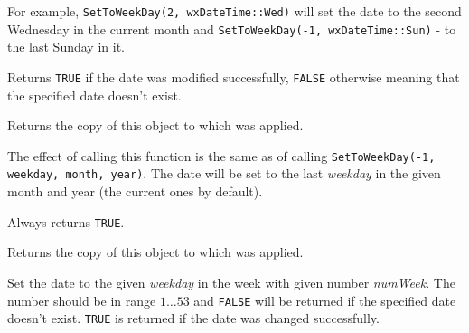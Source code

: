 For example, {\tt SetToWeekDay(2, wxDateTime::Wed)} will set the date to the
second Wednesday in the current month and 
{\tt SetToWeekDay(-1, wxDateTime::Sun)} - to the last Sunday in it.

Returns {\tt TRUE} if the date was modified successfully, {\tt FALSE}
otherwise meaning that the specified date doesn't exist.

\label{wxdatetimegetweekday2}


Returns the copy of this object to which 
 was applied.

\label{wxdatetimesettolastweekday}


The effect of calling this function is the same as of calling 
{\tt SetToWeekDay(-1, weekday, month, year)}. The date will be set to the last 
{\it weekday} in the given month and year (the current ones by default).

Always returns {\tt TRUE}.

\label{wxdatetimegetlastweekday}


Returns the copy of this object to which 
 was applied.

\label{wxdatetimesettotheweek}


Set the date to the given {\it weekday} in the week with given number 
{\it numWeek}. The number should be in range $1\ldots53$ and {\tt FALSE} will
be returned if the specified date doesn't exist. {\tt TRUE} is returned if the
date was changed successfully.

\label{wxdatetimegetweek}


